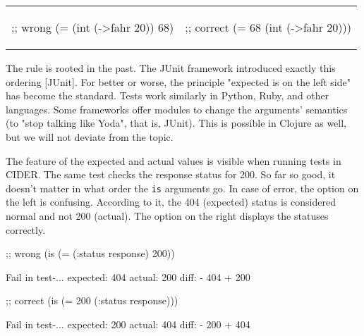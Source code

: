 \begin{english}

\noindent
\begin{tabular}{ @{}p{5cm} @{}p{5cm} }

  \begin{clojure}
;; wrong
(= (int (->fahr 20)) 68)
  \end{clojure}

&

  \begin{clojure}
;; correct
(= 68 (int (->fahr 20)))
  \end{clojure}

\end{tabular}

\end{english}

\fi


The rule is rooted in the past. The JUnit framework introduced exactly this ordering [JUnit]. For better or worse, the principle "expected is on the left side" has become the standard. Tests work similarly in Python, Ruby, and other languages. Some frameworks offer modules to change the arguments' semantics (to "stop talking like Yoda", that is, JUnit). This is possible in Clojure as well, but we will not deviate from the topic.


The feature of the expected and actual values is visible when running tests in CIDER. The same test checks the response status for 200. So far so good, it doesn't matter in what order the \verb|is| arguments go. In case of error, the option on the left is confusing. According to it, the 404 (expected) status is considered normal and not 200 (actual). The option on the right displays the statuses correctly.

\ifx\DEVICETYPE\MOBILE

\begin{english}
  \begin{clojure}
;; wrong
(is (= (:status response)
       200))

Fail in test-...
expected: 404
  actual: 200
    diff: - 404
          + 200
  \end{clojure}

\splitter

  \begin{clojure}
;; correct
(is (= 200
       (:status response)))

Fail in test-...
expected: 200
  actual: 404
    diff: - 200
          + 404
  \end{clojure}
\end{english}

